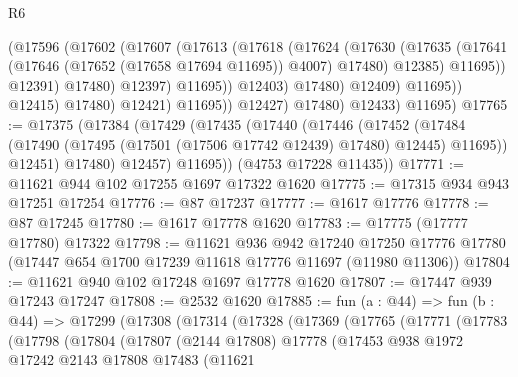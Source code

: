 \begin{lexlean}{R6}
\begin{coremodule}
                                (@17596
                                  (@17602
                                    (@17607
                                      (@17613
                                        (@17618
                                          (@17624
                                            (@17630
                                              (@17635
                                                (@17641
                                                  (@17646 (@17652 (@17658 @17694 @11695)) @4007)
                                                  @17480)
                                                @12385)
                                              @11695))
                                          @12391)
                                        @17480)
                                      @12397)
                                    @11695))
                                @12403)
                              @17480)
                            @12409)
                          @11695))
                      @12415)
                    @17480)
                  @12421)
                @11695))
            @12427)
          @17480)
        @12433)
      @11695)
@17765 := @17375
    (@17384
      (@17429
        (@17435
          (@17440
            (@17446
              (@17452
                (@17484 (@17490 (@17495 (@17501 (@17506 @17742 @12439) @17480) @12445) @11695))
                @12451)
              @17480)
            @12457)
          @11695))
      (@4753 @17228 @11435))
@17771 := @11621 @944 @102 @17255 @1697 @17322 @1620
@17775 := @17315 @934 @943 @17251 @17254
@17776 := @87 @17237
@17777 := @1617 @17776
@17778 := @87 @17245
@17780 := @1617 @17778 @1620
@17783 := @17775 (@17777 @17780) @17322
@17798 := @11621
    @936
    @942
    @17240
    @17250
    @17776
    @17780
    (@17447 @654 @1700 @17239 @11618 @17776 @11697 (@11980 @11306))
@17804 := @11621 @940 @102 @17248 @1697 @17778 @1620
@17807 := @17447 @939 @17243 @17247
@17808 := @2532 @1620
@17885 := fun (a : @44) =>
  fun (b : @44) =>
  @17299
    (@17308
      (@17314
        (@17328
          (@17369
            (@17765
              (@17771
                (@17783
                  (@17798
                    (@17804
                      (@17807
                        (@2144 @17808)
                        @17778
                        (@17453
                          @938
                          @1972
                          @17242
                          @2143
                          @17808
                          @17483
                          (@11621

\end{coremodule}
\end{lexlean}
